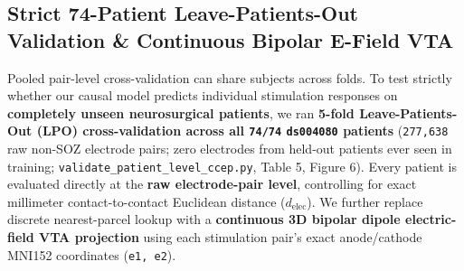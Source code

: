 \documentclass[11pt,a4paper]{article}
\begin{document}
\subsection{Strict 74-Patient Leave-Patients-Out Validation \& Continuous Bipolar E-Field VTA}
Pooled pair-level cross-validation can share subjects across folds. To test strictly whether our causal model predicts individual stimulation responses on \textbf{completely unseen neurosurgical patients}, we ran \textbf{5-fold Leave-Patients-Out (LPO) cross-validation across all \texttt{74/74} \texttt{ds004080} patients} (\texttt{277,638} raw non-SOZ electrode pairs; zero electrodes from held-out patients ever seen in training; \texttt{validate\_patient\_level\_ccep.py}, Table 5, Figure 6). Every patient is evaluated directly at the \textbf{raw electrode-pair level}, controlling for exact millimeter contact-to-contact Euclidean distance ($d_{\text{elec}}$). We further replace discrete nearest-parcel lookup with a \textbf{continuous 3D bipolar dipole electric-field VTA projection} using each stimulation pair's exact anode/cathode MNI152 coordinates (\texttt{e1, e2}).
\end{document}

